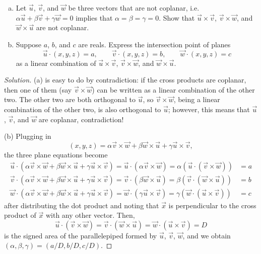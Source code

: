 \documentclass[11pt]{scrartcl}
\providecommand{\ii}{\item}
\newenvironment{soln}{\begin{proof}[Solution]}{\end{proof}}
\begin{document}
\begin{problem}
	\begin{enumerate}[(a)]
		\ii Let $\vec u$, $\vec v$, and $\vec w$ be three vectors
		that are not coplanar, i.e.
		$\alpha\vec u + \beta\vec v + \gamma\vec w = 0$
		implies that $\alpha = \beta = \gamma = 0$.
		Show that $\vec u\times\vec v$, $\vec v\times\vec w$, and
		$\vec w\times\vec u$ are not coplanar.
		\ii Suppose $a$, $b$, and $c$ are reals.
		Express the intersection point of planes
		\[\vec u\cdot(x, y, z) = a,\qquad
		\vec v\cdot(x, y, z) = b,\qquad
		\vec w\cdot(x, y, z) = c\]
		as a linear combination of $\vec u\times\vec v$,
		$\vec v\times\vec w$, and $\vec w\times\vec u$.
	\end{enumerate}
\end{problem}

\begin{soln}
	(a) is easy to do by contradiction:
	if the cross products are coplanar, then one of them
	(say $\vec v\times\vec w$) can be written as a linear combination of the
	other two. The other two are both orthogonal to $\vec u$,
	so $\vec v\times\vec w$, being a linear combination of the other two,
	is also orthogonal to $\vec u$; however, this means that
	$\vec u$, $\vec v$, and $\vec w$ are coplanar, contradiction!
	
	(b) Plugging in
	\[(x, y, z) = \alpha \vec v\times\vec w + \beta\vec w\times\vec u
	+ \gamma\vec u\times\vec v,\]
	the three plane equations become
	\begin{align*}
		\vec u\cdot (\alpha \vec v\times\vec w + \beta\vec w\times\vec u
		+ \gamma\vec u\times\vec v) = \vec u\cdot(\alpha\vec v\times \vec w)
		= \alpha(\vec u\cdot(\vec v\times \vec w)) &= a\\
		\vec v\cdot (\alpha \vec v\times\vec w + \beta\vec w\times\vec u
		+ \gamma\vec u\times\vec v) = \vec v\cdot(\beta\vec w\times \vec u)
		= \beta(\vec v\cdot(\vec w\times \vec u)) &= b\\
		\vec w\cdot (\alpha \vec v\times\vec w + \beta\vec w\times\vec u
		+ \gamma\vec u\times\vec v) = \vec w\cdot(\gamma\vec u\times \vec v)
		= \gamma(\vec w\cdot(\vec u\times \vec v)) &= c
	\end{align*}
	after distributing the dot product and noting that
	$\vec x$ is perpendicular to the cross product of $\vec x$
	with any other vector.
	Then,
	\[\vec u\cdot(\vec v\times\vec w) =
	\vec v\cdot(\vec w\times\vec u) =
	\vec w\cdot(\vec u\times\vec v) = D\]
	is the signed area of the parallelepiped formed by $\vec u$, $\vec v$,
	$\vec w$, and we obtain
	$(\alpha, \beta, \gamma) = (a/D, b/D, c/D)$.
\end{soln}
\end{document}
